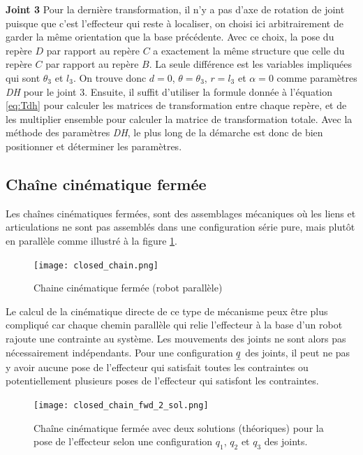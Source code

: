 \begin{example}
%
\textbf{Joint 3 } Pour la dernière transformation, il n'y a pas d'axe de rotation de joint puisque que c'est l'effecteur qui reste à localiser, on choisi ici arbitrairement de garder la même orientation que la base précédente. Avec ce choix, la pose du repère $D$ par rapport au repère $C$ a exactement la même structure que celle du repère $C$ par rapport au repère $B$. La seule différence est les variables impliquées qui sont $\theta_3$ et $l_3$. On trouve donc $d=0$, $\theta= \theta_3$, $r=l_3$ et $\alpha=0$ comme paramètres \textit{DH} pour le joint 3.
%
Ensuite, il suffit d'utiliser la formule donnée à l'équation \eqref{eq:Tdh} pour calculer les matrices de transformation entre chaque repère, et de les multiplier ensemble pour calculer la matrice de transformation totale. Avec la méthode des paramètres \textit{DH}, le plus long de la démarche est donc de bien positionner et déterminer les paramètres.  
\end{example}










\newpage
\subsection{Chaîne cinématique fermée}

Les chaînes cinématiques fermées, sont des assemblages mécaniques où les liens et articulations ne sont pas assemblés dans une configuration série pure, mais plutôt en parallèle comme illustré à la figure \ref{fig:closed_chain}.
\begin{figure}[H]
	\centering
		\texttt{[image: closed\_chain.png]}
	\caption{Chaine cinématique fermée (robot parallèle)}
	\label{fig:closed_chain}
\end{figure}

Le calcul de la cinématique directe de ce type de mécanisme peux être plus compliqué car chaque chemin parallèle qui relie l'effecteur à la base d'un robot rajoute une contrainte au système. Les mouvements des joints ne sont alors pas nécessairement indépendants. Pour une configuration $\underline{q}$ des joints, il peut ne pas y avoir aucune pose de l'effecteur qui satisfait toutes les contraintes ou potentiellement plusieurs poses de l'effecteur qui satisfont les contraintes.
\begin{figure}[H]
	\centering
		\texttt{[image: closed\_chain\_fwd\_2\_sol.png]}
	\caption{Chaîne cinématique fermée avec deux solutions (théoriques) pour la pose de l'effecteur selon une configuration $q_1$, $q_2$ et $q_3$ des joints. }
	\label{fig:closed_chain_fwd_2_sol}
\end{figure}


